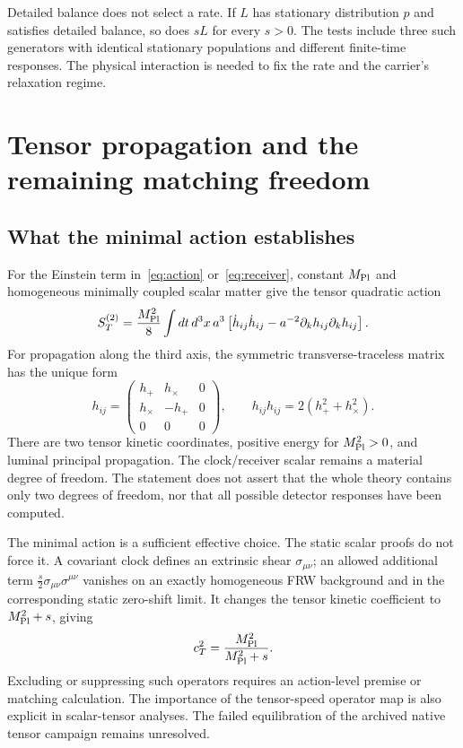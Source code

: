 \documentclass[11pt]{article}
\begin{document}
Detailed balance does not select a rate. If $L$ has stationary distribution
$p$ and satisfies detailed balance, so does $sL$ for every $s>0$. The tests
include three such generators with identical stationary populations and
different finite-time responses. The physical interaction is needed to fix
the rate and the carrier's relaxation regime.

\section{Tensor propagation and the remaining matching freedom}
\subsection{What the minimal action establishes}
For the Einstein term in~\eqref{eq:action} or~\eqref{eq:receiver}, constant
$M_{\rm Pl}$ and homogeneous minimally coupled scalar matter give the tensor
quadratic action
\begin{equation}
 S_T^{(2)}=\frac{M_{\rm Pl}^2}{8}\int dt\,d^3x\,a^3
 \left[\dot h_{ij}\dot h_{ij}-a^{-2}\partial_kh_{ij}\partial_kh_{ij}\right].
\end{equation}
For propagation along the third axis, the symmetric transverse-traceless
matrix has the unique form
\begin{equation}
 h_{ij}=\begin{pmatrix}h_+&h_\times&0\\h_\times&-h_+&0\\0&0&0\end{pmatrix},
 \qquad h_{ij}h_{ij}=2(h_+^2+h_\times^2).
\end{equation}
There are two tensor kinetic coordinates, positive energy for
$M_{\rm Pl}^2>0$, and luminal principal propagation. The clock/receiver scalar
remains a material degree of freedom. The statement does not assert that
the whole theory contains only two degrees of freedom, nor that all possible
detector responses have been computed.

The minimal action is a sufficient effective choice. The static scalar
proofs do not force it. A covariant clock defines an extrinsic shear
$\sigma_{\mu\nu}$; an allowed additional term
$\frac{s}{2}\sigma_{\mu\nu}\sigma^{\mu\nu}$ vanishes on an exactly homogeneous
FRW background and in the corresponding static zero-shift limit. It changes
the tensor kinetic coefficient to $M_{\rm Pl}^2+s$, giving
\begin{equation}
 c_T^2=\frac{M_{\rm Pl}^2}{M_{\rm Pl}^2+s}.
\end{equation}
Excluding or suppressing such operators requires an action-level premise or
matching calculation. The importance of the tensor-speed operator map is
also explicit in scalar-tensor analyses\cite{Ezquiaga}. The failed
equilibration of the archived native tensor campaign remains unresolved.
\end{document}
